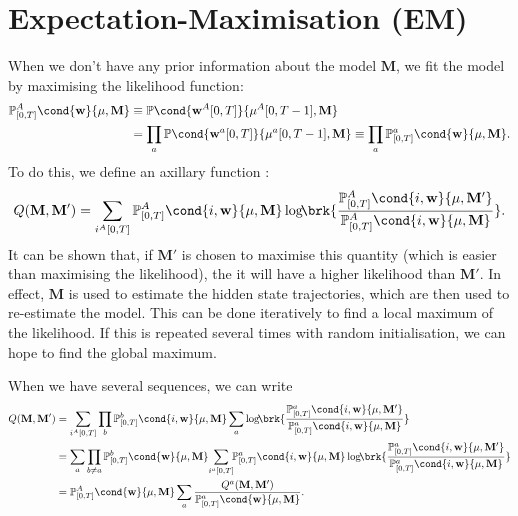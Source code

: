 \documentclass[12pt]{article}
\newcommand{\w}{\mathbf{w}}
\newcommand{\M}{\mathbf{M}}
\newcommand{\pr}{\mathbb{P}}
\begin{document}
\section{Expectation-Maximisation (EM) \label{sec:em}}

When we don't have any prior information about the model $\M$, we fit the model by maximising the likelihood function:
%
\begin{equation}\label{eq:like}
\begin{aligned}
  \pr^A_{[0,T]}\cond{\w}{\mu,\M}
    &\equiv \pr\cond{\w^A[0,T]}{\mu^A[0,T-1],\M}  \\
    &= \prod_a \pr\cond{\w^a[0,T]}{\mu^a[0,T-1],\M}
      \equiv \prod_a \pr^a_{[0,T]}\cond{\w}{\mu,\M}.
\end{aligned}
\end{equation}
%
To do this, we define an axillary function \cite{Baum1970baumwelch,Dempster2007EM}:
%
\begin{equation}\label{eq:emq}
  Q(\M,\M') = \sum_{{i^A[0,T]}} 
      \pr^A_{[0,T]}\cond{i,\w}{\mu,\M} \log\!\! \brk{
      \frac{ \pr^A_{[0,T]}\cond{i,\w}{\mu,\M'} }
           { \pr^A_{[0,T]}\cond{i,\w}{\mu,\M} } }.
\end{equation}
%
It can be shown that, if $\M'$ is chosen to maximise this quantity (which is easier than maximising the likelihood), the it will have a higher likelihood than $\M'$.
In effect, $\M$ is used to estimate the hidden state trajectories, which are then used to re-estimate the model.
This can be done iteratively to find a local maximum of the likelihood.
If this is repeated several times with random initialisation, we can hope to find the global maximum.

When we have several sequences, we can write
%
\begin{equation}\label{eq:emqseveral}
\begin{aligned}
  Q(\M,\M') &= \sum_{i^A[0,T]} \prod_b 
    \pr^b_{[0,T]}\cond{i,\w}{\mu,\M} \sum_a  \log\!\!  \brk{
      \frac{ \pr^a_{[0,T]}\cond{i,\w}{\mu,\M'} }
           { \pr^a_{[0,T]}\cond{i,\w}{\mu,\M} } } \\
   &= \sum_a \prod_{b \neq a} 
   \pr^b_{[0,T]}\cond{\w}{\mu,\M}\! 
   \sum_{i^a[0,T]}\!\! \pr^a_{[0,T]}\cond{i,\w}{\mu,\M} \log\!\!  \brk{
      \frac{ \pr^a_{[0,T]}\cond{i,\w}{\mu,\M'} }
           { \pr^a_{[0,T]}\cond{i,\w}{\mu,\M} } } \\
   &= \pr^A_{[0,T]}\cond{\w}{\mu,\M} \sum_a 
      \frac{Q^a(\M,\M')}{\pr^a_{[0,T]}\cond{\w}{\mu,\M}}.
\end{aligned}
\end{equation}
%
\end{document}
